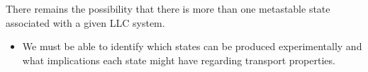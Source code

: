\documentclass{article}
\begin{document}

  There remains the possibility that there is more than one metastable state 
  associated with a given LLC system.
  \begin{itemize}
    \item We must be able to identify which states can be produced experimentally
    and what implications each state might have regarding transport properties.
  \end{itemize}
  
\end{document}
